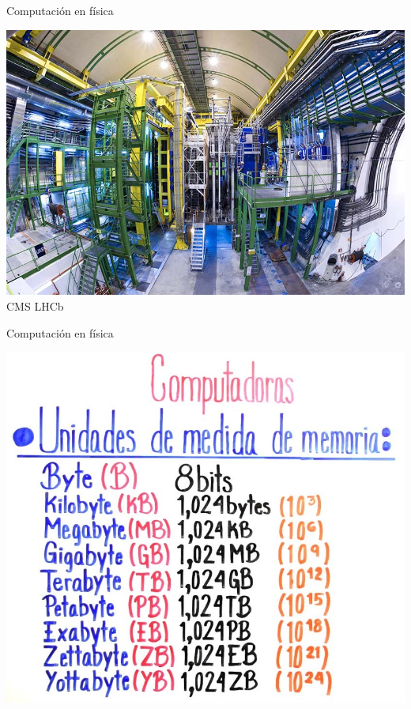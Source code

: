 \documentclass[10pt,xcolor={dvipsnames}]{beamer}
\begin{document}
\begin{frame}{Computación en física}
\begin{center}
\includegraphics[scale=0.43]{Figures/LHCb} \\
CMS \hspace{4cm} LHCb
\end{center}
\end{frame}

\begin{frame}{Computación en física}
\begin{center}
\includegraphics[scale=0.38]{Figures/unidades-de-medida-en-computacion}
\end{center}
\end{frame}
\end{document}
